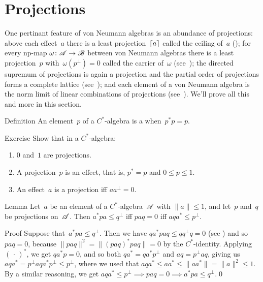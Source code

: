 \documentclass[a]{subfiles}
\begin{document}
\section{Projections}
\begin{parsec}%
\begin{point}%
One pertinant feature
of von Neumann algebras
is an abundance of projections:
above each effect~$a$ 
there is a least projection~$\left\lceil a\right\rceil$
called the ceiling of~$a$ ();
for every np-map $\omega\colon \mathscr{A}\to \mathscr{B}$
between von Neumann algebras
there is a least projection~$p$ with~$\omega(p^\perp)=0$
called the carrier of~$\omega$ (see~);
the directed supremum of projections is again a projection
and
the partial order of projections forms a complete lattice
(see~);
and each element of a von Neumann algebra is the norm limit
of linear combinations of projections
(see~).
We'll prove all this and more in this section.
\end{point}
\begin{point}{Definition}%
An element~$p$ of a $C^*$-algebra
is a 
when~$p^*p=p$.
\end{point}
\begin{point}{Exercise}%
Show that in a $C^*$-algebra:
\begin{enumerate}
\item
$0$ and~$1$ are projections.
\item
A projection~$p$ is an effect,
that is, $p^*=p$
and $0\leq p\leq 1$.
\item
An effect~$a$ is a projection iff $aa^\perp=0$.
\end{enumerate}
\end{point}
\begin{point}[ad-contraposed]{Lemma}%
Let~$a$ be an element of a $C^*$-algebra~$\mathscr{A}$
with $\|a\|\leq 1$,
and let~$p$ and~$q$ be projections on~$\mathscr{A}$.
Then 
$a^* p a \leq q^\perp$
iff $paq=0$
iff  $aqa^*\leq p^\perp$.
\begin{point}{Proof}%
Suppose that~$a^*pa\leq q^\perp$.
Then we have $q a^*pa q \leq qq^\perp q = 0$
(see )
and so $paq=0$,
because $\|paq\|^2=\|(paq)^*paq\|=0$
by the $C^*$-identity.
Applying $(\,\cdot\,)^*$,
we get $qa^*p=0$, and so both $qa^* = qa^*p^\perp$
and $aq = p^\perp aq$, giving
us $aqa^* = p^\perp a q a^* p^\perp 
\leq p^\perp$,
where we used that $aqa^*\leq aa^*\leq \|aa^*\|=\|a\|^2\leq 1$.
By a similar reasoning,
we get $aqa^*\leq p^\perp \implies paq=0\implies a^*pa\leq q^\perp$.\qed

\end{point}
\end{point}
\end{parsec}
\end{document}
